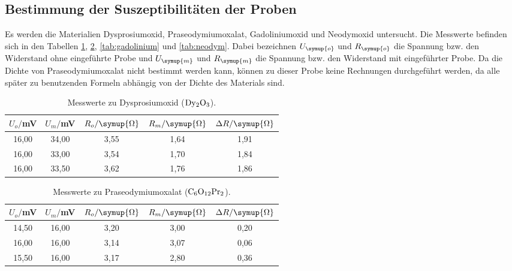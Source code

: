 \subsection{Bestimmung der Suszeptibilitäten der Proben}
\label{subsec:suszept}

Es werden die Materialien Dysprosiumoxid, Praseodymiumoxalat, Gadoliniumoxid und
Neodymoxid untersucht. Die Messwerte befinden sich in den Tabellen \ref{tab:dysprosium},
\ref{tab:seodynumoxid}, \ref{tab:gadolinium} und \ref{tab:neodym}. Dabei bezeichnen
$U_{\symup{o}}$ und $R_{\symup{o}}$ die Spannung bzw. den Widerstand ohne eingeführte
Probe und $U_{\symup{m}}$ und $R_{\symup{m}}$ die Spannung bzw. den Widerstand mit
eingeführter Probe. Da die Dichte von Praseodymiumoxalat nicht bestimmt werden
kann, können zu dieser Probe keine Rechnungen durchgeführt werden, da alle später
zu benutzenden Formeln abhängig von der Dichte des Materials sind.


\begin{table}[htp]
	\begin{center}
    \caption{Messwerte zu Dysprosiumoxid ($\ce{Dy2O3}$).}
    \label{tab:dysprosium}
		\begin{tabular}{ccccc}
		\toprule
			{$U_o/$mV} & {$U_m/$mV} & {$R_o/\symup{\Omega}$} & {$R_m/\symup{\Omega}$} & {$\Delta R/\symup{\Omega}$}\\
			\midrule
			16,00 & 34,00 & 3,55 & 1,64 & 1,91\\
			16,00 & 33,00 & 3,54 & 1,70 & 1,84\\
			16,00 & 33,50 & 3,62 & 1,76 & 1,86\\
		\bottomrule
		\end{tabular}
	\end{center}
\end{table}


\begin{table}[htp]
	\begin{center}
    \caption{Messwerte zu Praseodymiumoxalat ($\ce{C6O12Pr2}$).}
    \label{tab:seodynumoxid}
		\begin{tabular}{ccccc}
		\toprule
			{$U_o/$mV} & {$U_m/$mV} & {$R_o/\symup{\Omega}$} & {$R_m/\symup{\Omega}$} & {$\Delta R/\symup{\Omega}$}\\
			\midrule
			14,50 & 16,00 & 3,20 & 3,00 & 0,20\\
			16,00 & 16,00 & 3,14 & 3,07 & 0,06\\
			15,50 & 16,00 & 3,17 & 2,80 & 0,36\\
		\bottomrule
		\end{tabular}
	\end{center}
\end{table}


